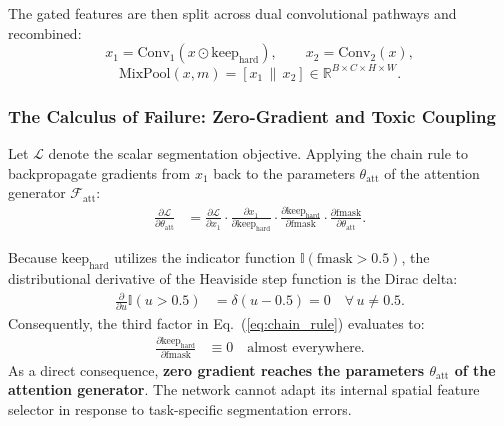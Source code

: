 The gated features are then split across dual convolutional pathways
and recombined:
\begin{equation}
  x_1 = \text{Conv}_1\!\left(x \odot \text{keep}_{\text{hard}}\right),
  \qquad
  x_2 = \text{Conv}_2(x),
\end{equation}
\begin{equation}
  \text{MixPool}(x, m) =
    \left[x_1 \,\|\, x_2\right]
    \in \mathbb{R}^{B \times C \times H \times W}.
\end{equation}

\subsubsection{The Calculus of Failure: Zero-Gradient and Toxic Coupling}
Let $\mathcal{L}$ denote the scalar segmentation objective. Applying the
chain rule to backpropagate gradients from $x_1$ back to the parameters
$\theta_{\text{att}}$ of the attention generator $\mathcal{F}_{\text{att}}$:
\begin{align}
  \label{eq:chain_rule}
  \frac{\partial \mathcal{L}}{\partial \theta_{\text{att}}}
    &= \frac{\partial \mathcal{L}}{\partial x_1}
       \cdot \frac{\partial x_1}{\partial \text{keep}_{\text{hard}}}
       \cdot \frac{\partial \text{keep}_{\text{hard}}}{\partial \text{fmask}}
       \cdot \frac{\partial \text{fmask}}{\partial \theta_{\text{att}}}.
\end{align}

Because $\text{keep}_{\text{hard}}$ utilizes the indicator function
$\mathbb{I}(\text{fmask} > 0.5)$, the distributional derivative of the
Heaviside step function is the Dirac delta:
\begin{align}
  \frac{\partial}{\partial u}\mathbb{I}(u > 0.5)
    &= \delta(u - 0.5) = 0 \quad \forall\, u \neq 0.5.
\end{align}
Consequently, the third factor in Eq.~(\ref{eq:chain_rule}) evaluates to:
\begin{align}
  \frac{\partial \text{keep}_{\text{hard}}}{\partial \text{fmask}}
    &\equiv 0 \quad \text{almost everywhere.}
\end{align}
As a direct consequence, \textbf{zero gradient reaches the parameters
$\theta_{\text{att}}$ of the attention generator}. The network cannot
adapt its internal spatial feature selector in response to task-specific
segmentation errors.


